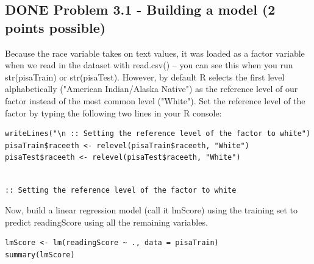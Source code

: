 \documentclass[letterpaper, 9pt, onecolumn, twoside, technote, final]{IEEEtran}
\begin{document}
\subsection{{\bfseries\sffamily DONE} Problem 3.1 - Building a model (2 points possible)}
\label{sec-2-8}
Because the race variable takes on text values, it was loaded as a
factor variable when we read in the dataset with read.csv() -- you can
see this when you run str(pisaTrain) or str(pisaTest). However, by
default R selects the first level alphabetically ("American
Indian/Alaska Native") as the reference level of our factor instead of
the most common level ("White"). Set the reference level of the factor
by typing the following two lines in your R console:

\begin{verbatim}
writeLines("\n :: Setting the reference level of the factor to white")
pisaTrain$raceeth <- relevel(pisaTrain$raceeth, "White")
pisaTest$raceeth <- relevel(pisaTest$raceeth, "White")
\end{verbatim}

\begin{verbatim}

:: Setting the reference level of the factor to white
\end{verbatim}

Now, build a linear regression model (call it lmScore) using the
training set to predict readingScore using all the remaining
variables.

\begin{verbatim}
lmScore <- lm(readingScore ~ ., data = pisaTrain)
summary(lmScore)
\end{verbatim}
\end{document}
